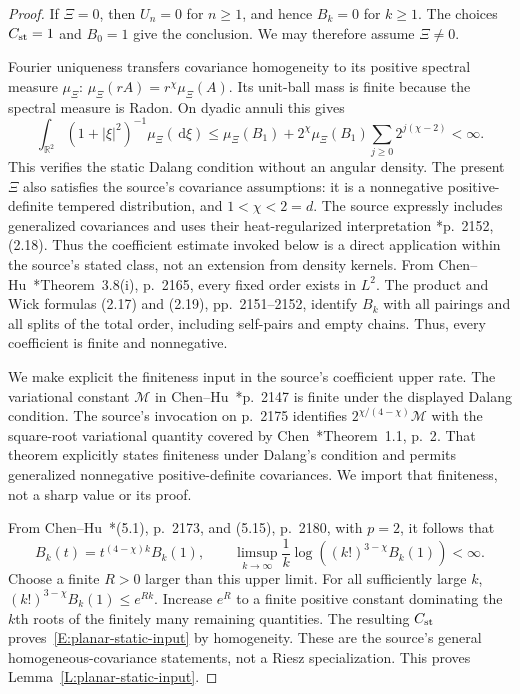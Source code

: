 \documentclass[12pt]{article}
\numberwithin{equation}{section}
\theoremstyle{definition}
\newcommand{\R}{\mathbb{R}}
\newcommand{\ud}{\,\mathrm{d}}
\begin{document}
\begin{proof}
  If $\Xi=0$, then $U_n=0$ for $n\ge1$, and hence $B_k=0$ for
  $k\ge1$. The choices $C_{\rm st}=1$ and $B_0=1$ give the
  conclusion. We may therefore assume $\Xi\ne0$.

  Fourier uniqueness transfers covariance homogeneity to its positive
  spectral measure $\mu_\Xi$:
  $\mu_\Xi(rA)=r^\chi\mu_\Xi(A)$. Its unit-ball mass is finite
  because the spectral measure is Radon. On dyadic annuli this gives
  \[
    \int_{\R^2}(1+|\xi|^2)^{-1}\mu_\Xi(\ud\xi)
    \le\mu_\Xi(B_1)
    +2^\chi\mu_\Xi(B_1)\sum_{j\ge0}2^{j(\chi-2)}<\infty.
  \]
  This verifies the static Dalang condition without an angular density.
  The present $\Xi$ also satisfies the source's covariance assumptions:
  it is a nonnegative positive-definite tempered distribution, and
  $1<\chi<2=d$. The source expressly includes generalized covariances
  and uses their heat-regularized interpretation
  \cite{chen.hu:25:hyperbolic}*{p.~2152, (2.18)}.
  Thus the coefficient estimate invoked below is a direct application
  within the source's stated class, not an extension from density kernels.
  From Chen--Hu~\cite{chen.hu:25:hyperbolic}*{Theorem~3.8(i), p.~2165},
  every fixed order exists in $L^2$. The product and Wick formulas
  (2.17) and (2.19), pp.~2151--2152, identify $B_k$ with all pairings
  and all splits of the total order, including self-pairs and empty
  chains. Thus, every coefficient is finite and nonnegative.

  We make explicit the finiteness input in the source's coefficient
  upper rate. The variational constant $\mathcal{M}$ in
  Chen--Hu~\cite{chen.hu:25:hyperbolic}*{p.~2147} is finite under the
  displayed Dalang condition. The source's invocation on p.~2175
  identifies $2^{\chi/(4-\chi)}\mathcal{M}$ with the square-root
  variational quantity covered by
  Chen~\cite{chen:23:exponential}*{Theorem~1.1, p.~2}.
  That theorem explicitly states finiteness under Dalang's condition
  and permits generalized nonnegative positive-definite covariances.
  We import that finiteness, not a sharp value or its proof.

  From Chen--Hu~\cite{chen.hu:25:hyperbolic}*{(5.1), p.~2173,
  and (5.15), p.~2180}, with $p=2$, it follows that
  \[
    B_k(t)=t^{(4-\chi)k}B_k(1),\qquad
    \limsup_{k\to\infty}\frac1k
    \log\left((k!)^{3-\chi}B_k(1)\right)<\infty.
  \]
  Choose a finite $R>0$ larger than this upper limit. For all sufficiently
  large $k$, $(k!)^{3-\chi}B_k(1)\le e^{Rk}$. Increase $e^R$ to a
  finite positive constant dominating the $k$th roots of the finitely
  many remaining quantities. The resulting $C_{\rm st}$
  proves~\eqref{E:planar-static-input} by homogeneity. These are the source's
  general homogeneous-covariance statements, not a Riesz specialization.
  This proves Lemma~\ref{L:planar-static-input}.
\end{proof}
\end{document}
